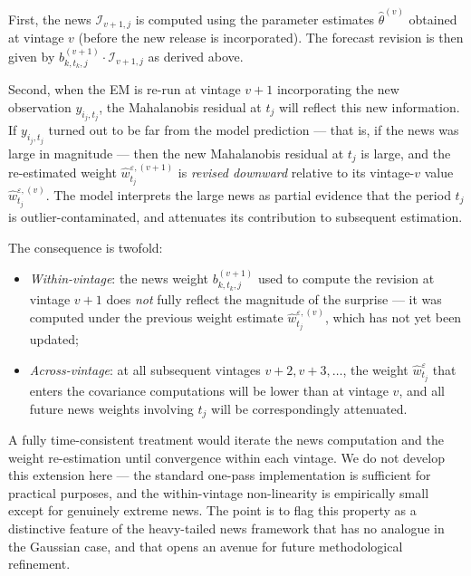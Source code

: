 \documentclass[11pt, a4paper, oneside]{article}
\begin{document}
First, the news $\mathcal{I}_{v+1, j}$ is computed using the
parameter estimates $\hat{\theta}^{(v)}$ obtained at vintage $v$
(before the new release is incorporated). The forecast revision is
then given by $b_{k, t_k, j}^{(v+1)} \cdot \mathcal{I}_{v+1, j}$ as
derived above.

Second, when the EM is re-run at vintage $v+1$ incorporating the new
observation $y_{i_j, t_j}$, the Mahalanobis residual at $t_j$ will
reflect this new information. If $y_{i_j, t_j}$ turned out to be far
from the model prediction — that is, if the news was large in
magnitude — then the new Mahalanobis residual at $t_j$ is large,
and the re-estimated weight $\hat{w}^{\varepsilon, (v+1)}_{t_j}$ is
\emph{revised downward} relative to its vintage-$v$ value
$\hat{w}^{\varepsilon, (v)}_{t_j}$. The model interprets the large
news as partial evidence that the period $t_j$ is
outlier-contaminated, and attenuates its contribution to subsequent
estimation.

The consequence is twofold:
\begin{itemize}[leftmargin=1.5em, itemsep=3pt]
    \item \emph{Within-vintage}: the news weight $b_{k, t_k, j}^{(v+1)}$
          used to compute the revision at vintage $v+1$ does \emph{not}
          fully reflect the magnitude of the surprise — it was
          computed under the previous weight estimate
          $\hat{w}^{\varepsilon, (v)}_{t_j}$, which has not yet been
          updated;
    \item \emph{Across-vintage}: at all subsequent vintages $v+2, v+3, \ldots$,
          the weight $\hat{w}^{\varepsilon}_{t_j}$ that enters the
          covariance computations will be lower than at vintage $v$,
          and all future news weights involving $t_j$ will be
          correspondingly attenuated.
\end{itemize}
A fully time-consistent treatment would iterate the news computation
and the weight re-estimation until convergence within each vintage.
We do not develop this extension here — the standard one-pass
implementation is sufficient for practical purposes, and the
within-vintage non-linearity is empirically small except for
genuinely extreme news. The point is to flag this property as a
distinctive feature of the heavy-tailed news framework that has no
analogue in the Gaussian case, and that opens an avenue for future
methodological refinement.
\end{document}
